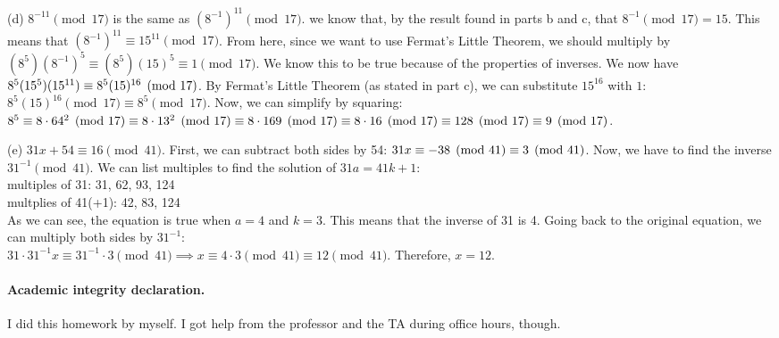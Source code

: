 \documentclass[11pt]{article}
\begin{document}
\begin{solution}
    \pagebreak
    \medskip\noindent
    (d) $8^{-11}\pmod{17}$ is the same 
        as $(8^{-1})^{11}\pmod{17}$.
        we know that, by the result 
        found in parts b and c,
        that $8^{-1}\pmod{17} = 15$.
        This means that
        $(8^{-1})^{11}
        \equiv 15^{11} \pmod{17}$. 
        From here, since we want to use Fermat's 
        Little Theorem, we should multiply by 
        $(8^5)(8^{-1})^{5} \equiv (8^5)(15)^{5} 
        \equiv 1\pmod{17}$.
        We know this to be true because of the properties
        of inverses. We now have
        $8^5(15^5)(15^{11})
        \\\equiv 8^5(15)^{16}\pmod{17}$. By Fermat's 
        Little Theorem (as stated in part c),
        we can substitute $15^{16}$ with $1$: 
        $8^5(15)^{16}\pmod{17} 
        \equiv 8^5\pmod{17}$. Now, we can simplify
        by squaring:
        \\ $8^5 \equiv 8 \cdot 64^2\pmod{17}
        \\ \equiv 8 \cdot 13^2\pmod{17}
        \\ \equiv 8 \cdot 169\pmod{17}
        \\ \equiv 8 \cdot 16\pmod{17}
        \\ \equiv 128\pmod{17}
        \\ \equiv 9\pmod{17}
        $.

        \medskip\noindent
        (e) $31x+54\equiv16\pmod{41}$. 
        First, we can subtract both sides 
        by 54: $31x\equiv-38\pmod{41}
        \\\equiv3\pmod{41}$. Now, we have to find
        the inverse $31^{-1}\pmod{41}$. We can list
        multiples to find the solution of
        $31a = 41k + 1$: 
        \\ multiples of 31: 31, 62, 93, 124
        \\ multplies of 41(+1): 42, 83, 124
        \\ As we can see, the equation is true 
        when $a=4$ and $k=3$. This means that the
        inverse of 31 is 4. Going back to the 
        original equation, we can multiply
        both sides by $31^{-1}$: 
        \\ $31 \cdot 31^{-1}x 
        \equiv 31^{-1}\cdot 3\pmod{41}
        \implies x \equiv 4 \cdot 3 \pmod{41}
        \equiv 12 \pmod{41}
        $. Therefore, $x=12$.
\end{solution}

\paragraph{Academic integrity declaration.} 
I did this homework by myself. I got help from the professor
and the TA during office hours, though.
\end{document}
